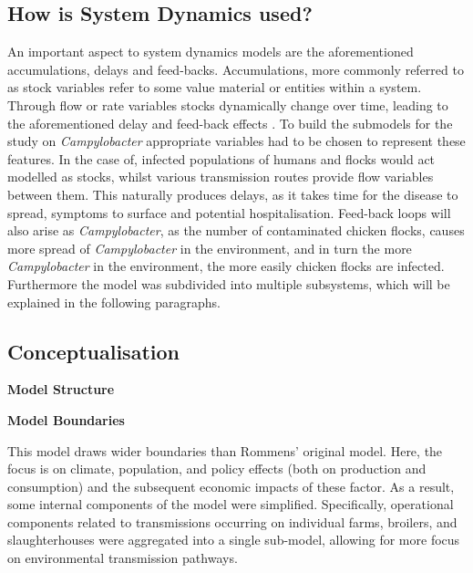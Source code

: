 \subsection{How is System Dynamics used?}
An important aspect to system dynamics models are the aforementioned accumulations, delays and feed-backs. Accumulations, more commonly referred to as stock variables refer to some value material or entities within a system. Through flow or rate variables stocks dynamically change over time, leading to the aforementioned delay and feed-back effects \parencite{sterman_system_2001}. To build the submodels for the study on \textit{Campylobacter} appropriate variables had to be chosen to represent these features. In the case of, infected populations of humans and flocks would act modelled as stocks, whilst various transmission routes provide flow variables between them. This naturally produces delays, as it takes time for the disease to spread, symptoms to surface and potential hospitalisation. Feed-back loops will also arise as \textit{Campylobacter}, as the number of contaminated chicken flocks, causes more spread of \textit{Campylobacter} in the environment, and in turn the more \textit{Campylobacter} in the environment, the more easily chicken flocks are infected. Furthermore the model was subdivided into multiple subsystems, which will be explained in the following paragraphs. 


\subsection{Conceptualisation}

\textbf{Model Structure}



\textbf{Model Boundaries}

This model draws wider boundaries than Rommens' original model. Here, the focus is on climate, population, and policy effects (both on production and consumption) and the subsequent economic impacts of these factor. As a result, some internal components of the model were simplified. Specifically, operational components related to transmissions occurring on individual farms, broilers, and slaughterhouses were aggregated into a single sub-model, allowing for more focus on environmental transmission pathways.

